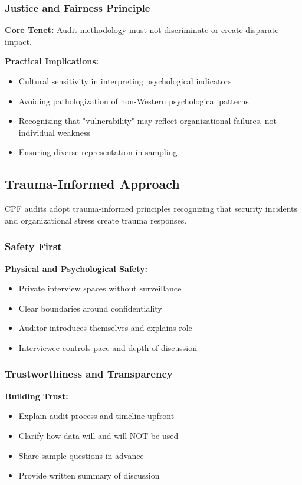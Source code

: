 \documentclass[11pt,a4paper]{article}
\begin{document}
\subsubsection{Justice and Fairness Principle}

\textbf{Core Tenet:} Audit methodology must not discriminate or create disparate impact.

\textbf{Practical Implications:}
\begin{itemize}
\item Cultural sensitivity in interpreting psychological indicators
\item Avoiding pathologization of non-Western psychological patterns
\item Recognizing that "vulnerability" may reflect organizational failures, not individual weakness
\item Ensuring diverse representation in sampling
\end{itemize}

\subsection{Trauma-Informed Approach}

CPF audits adopt trauma-informed principles recognizing that security incidents and organizational stress create trauma responses.

\subsubsection{Safety First}

\textbf{Physical and Psychological Safety:}
\begin{itemize}
\item Private interview spaces without surveillance
\item Clear boundaries around confidentiality
\item Auditor introduces themselves and explains role
\item Interviewee controls pace and depth of discussion
\end{itemize}

\subsubsection{Trustworthiness and Transparency}

\textbf{Building Trust:}
\begin{itemize}
\item Explain audit process and timeline upfront
\item Clarify how data will and will NOT be used
\item Share sample questions in advance
\item Provide written summary of discussion
\end{itemize}
\end{document}
